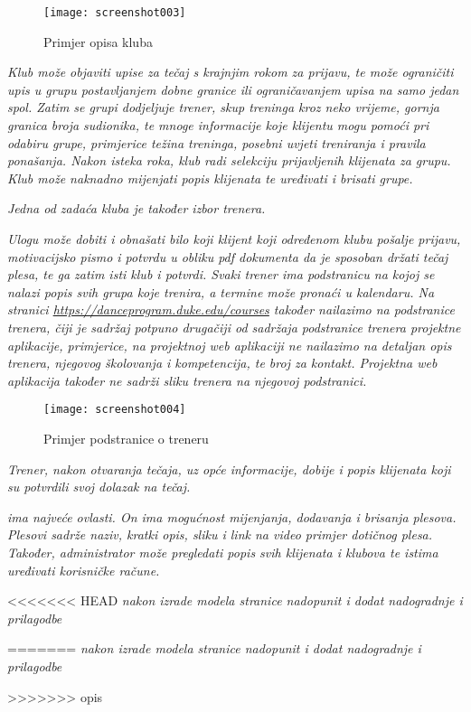 \begin{figure}[H]
	\centering
	\texttt{[image: screenshot003]}
	\caption{Primjer opisa kluba}
	\label{fig:screenshot003}
\end{figure}

\textit{Klub može objaviti upise za tečaj s krajnjim rokom za prijavu, te može ograničiti upis u grupu postavljanjem dobne granice ili ograničavanjem upisa na samo jedan spol. Zatim se grupi dodjeljuje trener, skup treninga kroz neko vrijeme, gornja granica broja sudionika, te mnoge informacije koje klijentu mogu pomoći pri odabiru grupe, primjerice težina treninga, posebni uvjeti treniranja i pravila ponašanja. Nakon isteka roka, klub radi selekciju prijavljenih klijenata za grupu. Klub može naknadno mijenjati popis klijenata te uređivati i brisati grupe.}

\textit{Jedna od zadaća kluba je također izbor trenera.}

\textit{Ulogu  može dobiti i obnašati bilo koji klijent koji određenom klubu pošalje prijavu, motivacijsko pismo i potvrdu u obliku pdf dokumenta da je sposoban držati tečaj plesa, te ga zatim isti klub i potvrdi. Svaki trener ima podstranicu na kojoj se nalazi popis svih grupa koje trenira, a termine može pronaći u kalendaru. Na stranici \url{https://danceprogram.duke.edu/courses} također nailazimo na podstranice trenera, čiji je sadržaj potpuno drugačiji od sadržaja podstranice trenera projektne aplikacije, primjerice, na projektnoj web aplikaciji ne nailazimo na detaljan opis trenera, njegovog školovanja i kompetencija, te broj za kontakt. Projektna web aplikacija također ne sadrži sliku trenera na njegovoj podstranici.}

\begin{figure}[H]
	\centering
	\texttt{[image: screenshot004]}
	\caption{Primjer podstranice o treneru}
	\label{fig:screenshot004}
\end{figure}

\textit{Trener, nakon otvaranja tečaja, uz opće informacije, dobije i popis klijenata koji su potvrdili svoj dolazak na tečaj.}

\textit{ ima najveće ovlasti. On ima mogućnost mijenjanja, dodavanja i brisanja plesova. Plesovi sadrže naziv, kratki opis, sliku i link na video primjer dotičnog plesa. Također, administrator može pregledati popis svih klijenata i klubova te istima uređivati korisničke račune.}

<<<<<<< HEAD
\textit{nakon izrade modela stranice nadopunit i dodat nadogradnje i prilagodbe}
		
=======
\textit{nakon izrade modela stranice nadopunit i dodat nadogradnje i prilagodbe} 		
	
>>>>>>> opis
